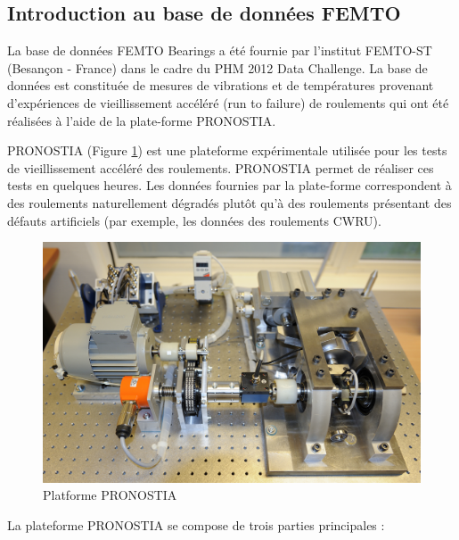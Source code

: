 \subsection{Introduction au base de données FEMTO}%
\label{sub:introduction_au_base_de_donnees_femto}

La base de données FEMTO Bearings a été fournie par l'institut FEMTO-ST (Besançon - France) dans le cadre du PHM 2012 Data Challenge. La base de données est constituée de mesures de vibrations et de températures provenant d'expériences de vieillissement accéléré (run to failure) de roulements qui ont été réalisées à l'aide de la plate-forme PRONOSTIA.

PRONOSTIA (Figure \ref{fig:pronostia-platform}) est une plateforme expérimentale utilisée pour les tests de vieillissement accéléré des roulements. PRONOSTIA permet de réaliser ces tests en quelques heures. Les données fournies par la plate-forme correspondent à des roulements naturellement dégradés plutôt qu'à des roulements présentant des défauts artificiels (par exemple, les données des roulements CWRU).

\begin{figure}[h]
	\centering
	\includegraphics[width=.8\linewidth]{figures/pronostia.jpg}
	\caption{Platforme PRONOSTIA \cite{pronostia}}%
	\label{fig:pronostia-platform}
\end{figure}

La plateforme PRONOSTIA se compose de trois parties principales :


